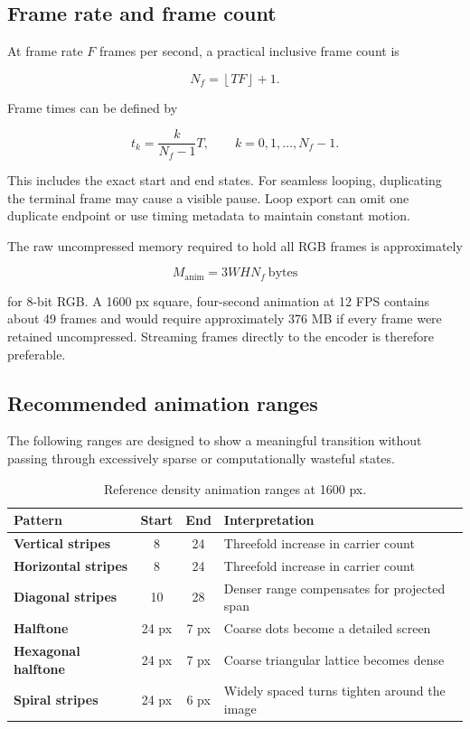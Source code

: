 \subsection{Frame rate and frame count}

At frame rate $F$ frames per second, a practical inclusive frame count is

\begin{equation}
N_f=\left\lfloor TF\right\rfloor+1.
\label{eq:framecount}
\end{equation}

Frame times can be defined by

\begin{equation}
t_k=\frac{k}{N_f-1}T,
\qquad k=0,1,\ldots,N_f-1.
\label{eq:frametimes}
\end{equation}

This includes the exact start and end states. For seamless looping, duplicating the terminal frame may cause a visible pause. Loop export can omit one duplicate endpoint or use timing metadata to maintain constant motion.

The raw uncompressed memory required to hold all RGB frames is approximately

\begin{equation}
M_{\mathrm{anim}}=3WHN_f\ \text{bytes}
\label{eq:animmemory}
\end{equation}

for 8-bit RGB. A 1600 px square, four-second animation at 12 FPS contains about 49 frames and would require approximately 376 MB if every frame were retained uncompressed. Streaming frames directly to the encoder is therefore preferable.

\subsection{Recommended animation ranges}

The following ranges are designed to show a meaningful transition without passing through excessively sparse or computationally wasteful states.

\begin{table}[H]
\centering
\caption{Reference density animation ranges at 1600 px.}
\begin{tabularx}{\textwidth}{>{\bfseries}l c c >{\raggedright\arraybackslash}X}
\toprule
Pattern & Start & End & Interpretation \\
\midrule
Vertical stripes & 8 & 24 & Threefold increase in carrier count \\
Horizontal stripes & 8 & 24 & Threefold increase in carrier count \\
Diagonal stripes & 10 & 28 & Denser range compensates for projected span \\
Halftone & 24 px & 7 px & Coarse dots become a detailed screen \\
Hexagonal halftone & 24 px & 7 px & Coarse triangular lattice becomes dense \\
Spiral stripes & 24 px & 6 px & Widely spaced turns tighten around the image \\
\bottomrule
\end{tabularx}
\end{table}

